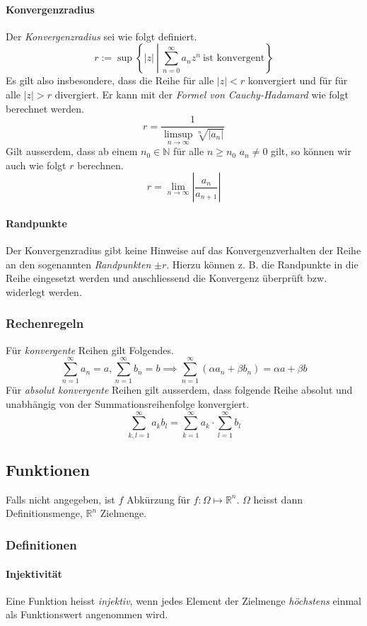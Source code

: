 \documentclass[a4paper, 9pt, DIV=24]{scrartcl}
\newcommand{\N}{\mathbb{N}}
\newcommand{\R}{\mathbb{R}}
\begin{document}
\paragraph{Konvergenzradius} Der \emph{Konvergenzradius} sei wie folgt definiert.
\[ r:=\sup \left\{ |z|\ \left|\ \sum_{n=0}^{\infty}a_n z^n\ \text{ist konvergent}\right.\right\}\]
Es gilt also insbesondere, dass die Reihe für alle $|z| < r$ konvergiert und für für alle $|z| > r$ divergiert.
Er kann mit der \emph{Formel von Cauchy-Hadamard} wie folgt berechnet werden.
\[ r = \frac{1}{\limsup_{n\to\infty} \sqrt[n]{|a_n|}} \]
Gilt ausserdem, dass ab einem $n_0\in\N$ für alle $n \geq n_0$ $a_n \neq 0$ gilt, so können wir auch wie folgt $r$ berechnen.
\[ r = \lim_{n\to\infty} \left | \frac{a_n}{a_{n+1}} \right | \]

\paragraph{Randpunkte}
Der Konvergenzradius gibt keine Hinweise auf das Konvergenzverhalten der Reihe an den sogenannten \emph{Randpunkten} $\pm r$.
Hierzu können z. B. die Randpunkte in die Reihe eingesetzt werden und anschliessend die Konvergenz überprüft bzw. widerlegt werden.

\subsubsection{Rechenregeln}
Für \emph{konvergente} Reihen gilt Folgendes.
\[
  \sum_{n=1}^\infty a_n = a, \sum_{n=1}^\infty b_n = b \implies
  \sum_{n=1}^\infty (\alpha a_n + \beta b_n) = \alpha a + \beta b
\]
Für \emph{absolut konvergente} Reihen gilt ausserdem, dass folgende Reihe absolut und unabhängig von der Summationsreihenfolge konvergiert.
\[
  \sum_{k,l=1}^\infty a_k b_l = \sum_{k=1}^\infty a_k \cdot \sum_{l=1}^\infty b_l
\]

\subsection{Funktionen}
Falls nicht angegeben, ist $f$ Abkürzung für $f: \Omega \mapsto \R^n$. $\Omega$ heisst dann Definitionsmenge, $\R^n$ Zielmenge.

\subsubsection{Definitionen}

\paragraph{Injektivität}
Eine Funktion heisst \emph{injektiv}, wenn jedes Element der Zielmenge \emph{höchstens} einmal als Funktionswert angenommen wird.
\end{document}
